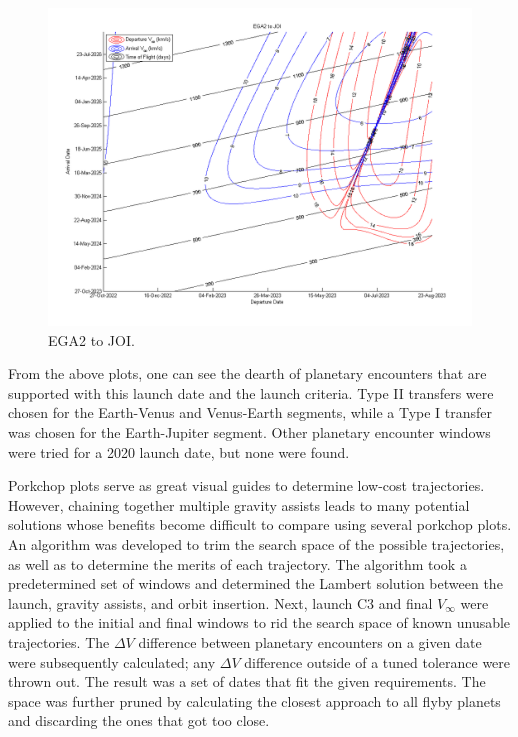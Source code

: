 \documentclass[]{aiaa-tc}%
\begin{document}
	\begin{figure}[H]
		\centering
			\includegraphics[width = 17.5cm]{../PCP/VEEJ/3_EGA2_JOI.png}
		\caption{EGA2 to JOI. }
		\label{fig:PCP_EGA2_JOI}
	\end{figure}	

From the above plots, one can see the dearth of planetary encounters that are supported with this launch date and the launch criteria. Type II transfers were chosen for the Earth-Venus and Venus-Earth segments, while a Type I transfer was chosen for the Earth-Jupiter segment. Other planetary encounter windows were tried for a 2020 launch date, but none were found.
	
	\vspace{5 mm}

	Porkchop plots serve as great visual guides to determine low-cost trajectories. However, chaining together multiple gravity assists leads to many potential solutions whose benefits become difficult to compare using several porkchop plots. An algorithm was developed to trim the search space of the possible trajectories, as well as to determine the merits of each trajectory. The algorithm took a predetermined set of windows and determined the Lambert solution between the launch, gravity assists, and orbit insertion. Next, launch C3 and final $V_\infty$ were applied to the initial and final windows to rid the search space of known unusable trajectories. The ${\Delta}V$ difference between planetary encounters on a given date were subsequently calculated; any ${\Delta}V$ difference outside of a tuned tolerance were thrown out. The result was a set of dates that fit the given requirements. The space was further pruned by calculating the closest approach to all flyby planets and discarding the ones that got too close.
	
\end{document}
